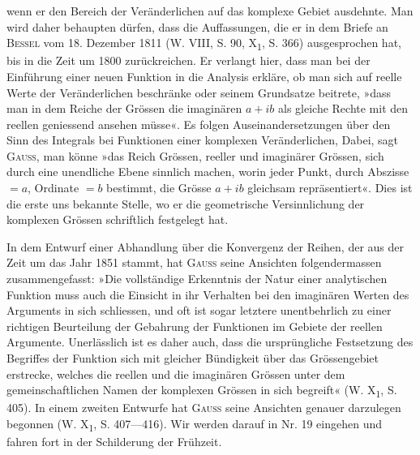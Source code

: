wenn er den Bereich der Veränderlichen auf das komplexe Gebiet ausdehnte.
Man wird daher behaupten dürfen, dass die Auffassungen, die er in
dem Briefe an \textsc{Bessel} vom 18. Dezember 1811 (W. VIII, S. 90, X\textsubscript{1}, S. 366)
ausgesprochen hat, bis in die Zeit um 1800 zurückreichen. Er verlangt hier,
dass man bei der Einführung einer neuen Funktion in die Analysis erkläre,
ob man sich auf reelle Werte der Veränderlichen beschränke oder seinem
Grundsatze beitrete, »dass man in dem Reiche der Grössen die imaginären
\(a+ib\) als gleiche Rechte mit den reellen geniessend ansehen müsse«. Es
folgen Auseinandersetzungen über den Sinn des Integrals bei Funktionen
einer komplexen Veränderlichen, Dabei, sagt \textsc{Gauss}, man könne »das 
Reich  Grössen, reeller und imaginärer Grössen, sich durch eine unendliche
Ebene sinnlich machen, worin jeder Punkt, durch Abszisse \(=a\), Ordinate
\(=b\) bestimmt, die Grösse \(a+ib\) gleichsam repräsentiert«. Dies ist die
erste uns bekannte Stelle, wo er die geometrische Versinnlichung der komplexen
Grössen schriftlich festgelegt hat.
\par
In dem Entwurf einer Abhandlung über die Konvergenz der Reihen, der
aus der Zeit um das Jahr 1851 stammt, hat \textsc{Gauss} seine Ansichten folgendermassen
zusammengefasst: »Die vollständige Erkenntnis der Natur einer analytischen
Funktion muss auch die Einsicht in ihr Verhalten bei den imaginären
Werten des Arguments in sich schliessen, und oft ist sogar letztere unentbehrlich
zu einer richtigen Beurteilung der Gebahrung der Funktionen im
Gebiete der reellen Argumente. Unerlässlich ist es daher auch, dass die ursprüngliche
Festsetzung des Begriffes der Funktion sich mit gleicher Bündigkeit
über das  Grössengebiet erstrecke, welches die reellen und die
imaginären Grössen unter dem gemeinschaftlichen Namen der komplexen
Grössen in sich begreift« (W. X\textsubscript{1}, S. 405).
\clearpage{}\setcounter{footnote}{0}
\noindent\hspace*{\parindent}In einem zweiten Entwurfe hat \textsc{Gauss} seine Ansichten genauer darzulegen
begonnen (W. X\textsubscript{1}, S. 407—416). Wir werden darauf in Nr. 19 eingehen und
fahren fort in der Schilderung der Frühzeit.
\clearpage\endgroup

